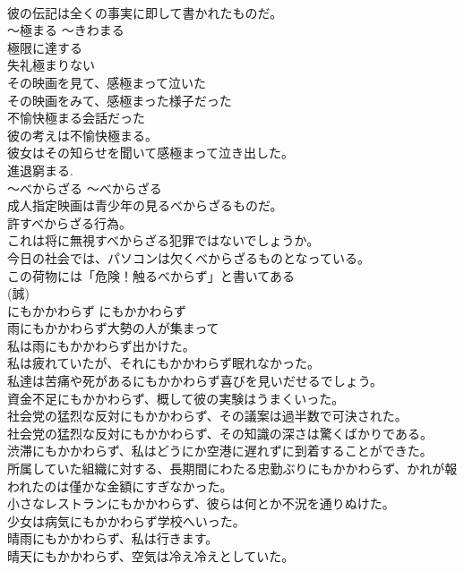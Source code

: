 \documentclass[8pt]{extreport}
\begin{document}
\begin{CJK}{UTF8}{min}
\\	彼の伝記は全くの事実に即して書かれたものだ。   
\\	〜極まる	〜きわまる	
\\	極限に達する	
\\	失礼極まりない   
\\	その映画を見て、感極まって泣いた   
\\	その映画をみて、感極まった様子だった   
\\	不愉快極まる会話だった   
\\	彼の考えは不愉快極まる。  
\\	彼女はその知らせを聞いて感極まって泣き出した。  
\\	進退窮まる.  
\\	〜べからざる	〜べからざる	
\\	成人指定映画は青少年の見るべからざるものだ。  
\\	許すべからざる行為。  
\\	これは将に無視すべからざる犯罪ではないでしょうか。  
\\	今日の社会では、パソコンは欠くべからざるものとなっている。  
\\	この荷物には「危険！触るべからず」と書いてある  
\\	(誠)
\\	にもかかわらず	にもかかわらず	
\\	雨にもかかわらず大勢の人が集まって  
\\	私は雨にもかかわらず出かけた。   
\\	私は疲れていたが、それにもかかわらず眠れなかった。   
\\	私達は苦痛や死があるにもかかわらず喜びを見いだせるでしょう。   
\\	資金不足にもかかわらず、概して彼の実験はうまくいった。   
\\	社会党の猛烈な反対にもかかわらず、その議案は過半数で可決された。   
\\	社会党の猛烈な反対にもかかわらず、その知識の深さは驚くばかりである。   
\\	渋滞にもかかわらず、私はどうにか空港に遅れずに到着することができた。   
\\	所属していた組織に対する、長期間にわたる忠勤ぶりにもかかわらず、かれが報われたのは僅かな金額にすぎなかった。   
\\	小さなレストランにもかかわらず、彼らは何とか不況を通りぬけた。   
\\	少女は病気にもかかわらず学校へいった。   
\\	晴雨にもかかわらず、私は行きます。   
\\	晴天にもかかわらず、空気は冷え冷えとしていた。   

\end{CJK}
\end{document}
